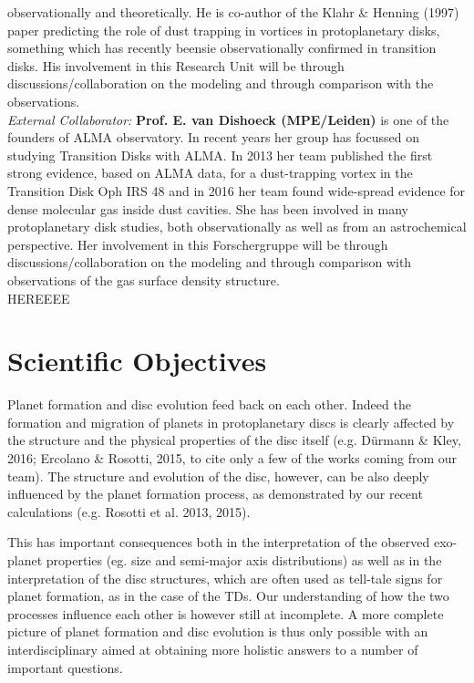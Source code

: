 \documentclass[12pt]{article}
\begin{document}
observationally and theoretically. He is co-author of the Klahr \&
Henning (1997) paper predicting the role of dust trapping in vortices
in protoplanetary disks, something which has recently beensie 
observationally confirmed in transition disks. His involvement in this
Research Unit will be through discussions/collaboration on the
modeling and through comparison with the observations. \\
{\it External Collaborator: } {\bf Prof. E. van Dishoeck (MPE/Leiden)}
is one of the founders of ALMA observatory. In recent years her group
has focussed on studying Transition Disks with ALMA. In 2013 her team
published the first strong evidence, based on ALMA data, for a
dust-trapping vortex in the Transition Disk Oph IRS 48 and in 2016 her team found wide-spread
 evidence for dense molecular gas inside dust cavities. She has been
involved in many protoplanetary disk studies, both observationally as
well as from an astrochemical perspective. Her involvement in this Forschergruppe
will be through discussions/collaboration on the modeling and through comparison with
 observations of the gas surface density structure.\\

HEREEEE

\section*{Scientific Objectives}

Planet formation and disc evolution feed back on each other. Indeed
the formation and migration of planets in protoplanetary discs is
clearly affected by the structure and the physical properties of the
disc itself (e.g. D\"urmann \& Kley, 2016; Ercolano \&
  Rosotti, 2015, to cite only a few of the works coming from our team). The
structure and evolution of the disc, however, can be also deeply
influenced by the planet formation process, as demonstrated by our
recent calculations (e.g. Rosotti et al. 2013, 2015). 

This has important consequences both in the interpretation of the observed
exo-planet properties (eg. size and semi-major axis distributions) as
well as in the interpretation of the disc structures, which are often
used as tell-tale signs for planet formation, as in the case of the
TDs. Our understanding of how the two processes
influence each other is however still at incomplete. A  more
complete picture of planet formation and disc evolution is thus only
possible with an interdisciplinary aimed at obtaining more holistic answers to
a number of important questions. 
\end{document}

